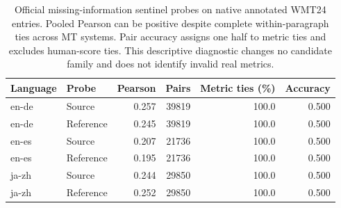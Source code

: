 \begin{table}[t]
\centering\small
\begin{tabular}{llrrrr}
\toprule
Language & Probe & Pearson & Pairs & Metric ties (\%) & Accuracy \\
\midrule
en-de & Source & 0.257 & 39819 & 100.0 & 0.500 \\
en-de & Reference & 0.245 & 39819 & 100.0 & 0.500 \\
en-es & Source & 0.207 & 21736 & 100.0 & 0.500 \\
en-es & Reference & 0.195 & 21736 & 100.0 & 0.500 \\
ja-zh & Source & 0.244 & 29850 & 100.0 & 0.500 \\
ja-zh & Reference & 0.252 & 29850 & 100.0 & 0.500 \\
\bottomrule
\end{tabular}
\caption{Official missing-information sentinel probes on native annotated WMT24 entries. Pooled Pearson can be positive despite complete within-paragraph ties across MT systems. Pair accuracy assigns one half to metric ties and excludes human-score ties. This descriptive diagnostic changes no candidate family and does not identify invalid real metrics.}
\label{tab:review-sentinel}
\end{table}
